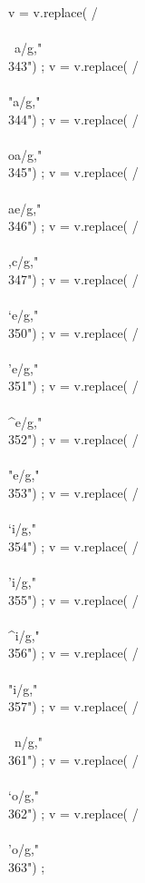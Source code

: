 {      v = v.replace(  /\\\\~a/g,"\\343") ;
      v = v.replace(  /\\\\"a/g,"\\344") ;
      v = v.replace(  /\\\\oa/g,"\\345") ;
      v = v.replace(  /\\\\ae/g,"\\346") ;
      v = v.replace(  /\\\\,c/g,"\\347") ;
      v = v.replace(  /\\\\`e/g,"\\350") ;
      v = v.replace(  /\\\\'e/g,"\\351") ;
      v = v.replace(  /\\\\^e/g,"\\352") ;
      v = v.replace(  /\\\\"e/g,"\\353") ;
      v = v.replace(  /\\\\`i/g,"\\354") ;
      v = v.replace(  /\\\\'i/g,"\\355") ;
      v = v.replace(  /\\\\^i/g,"\\356") ;
      v = v.replace(  /\\\\"i/g,"\\357") ;
      v = v.replace(  /\\\\~n/g,"\\361") ;
      v = v.replace(  /\\\\`o/g,"\\362") ;
      v = v.replace(  /\\\\'o/g,"\\363") ;
}
